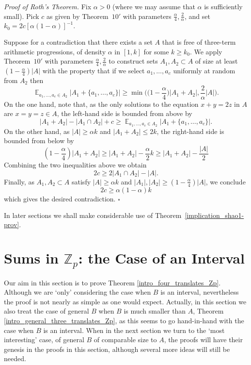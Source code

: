 \documentclass[12pt,reqno]{amsart}
\DeclareMathOperator*{\E}{\mathbb{E}}
\theoremstyle{definition}
\renewcommand\leq{\leqslant}
\renewcommand\geq{\geqslant}
\begin{document}
\vspace{5pt}
\noindent
{\em Proof of Roth's Theorem.}
Fix $\alpha>0$ (where we may assume that $\alpha$ is sufficiently small). Pick $c$ as given by
Theorem~$10'$ with parameters $\frac{\alpha}{4}, \frac{2}{\alpha}$, and set
$k_0=2c[\alpha(1-\alpha)]^{-1}$.

\vspace{5pt}
Suppose for a contradiction that there exists a set $A$ that is free of three-term arithmetic
progressions, of density $\alpha$ in $[1,k]$ for some $k \geq k_0$. We apply Theorem~$10'$
with parameters $\frac{\alpha}{4}, \frac{2}{\alpha}$ to construct sets $A_1, A_2 \subset A$ of size at least $(1-\frac{\alpha}{4})|A|$ with the property that if we select $a_1, \hdots, a_c$ uniformly at random
from $A_2$ then $$\E_{a_1, \hdots, a_c \in A_2}\bigg|A_1+\{a_1, \hdots, a_c\}\bigg| \geq \min\bigg(\big(1-\frac{\alpha}{4}\big)|A_1+A_2|,\frac{2}{\alpha} |A| \bigg).$$
On the one hand, note that, as the only solutions to the equation $x+y=2z$ in $A$ are $x=y=z \in A$, the left-hand side is bounded from above by $$|A_1+A_2|-|A_1\cap A_2|+c\geq \E_{a_1, \hdots, a_c \in A_2}\bigg|A_1+\{a_1, \hdots, a_c\}\bigg|.$$
On the other hand, as $|A| \geq \alpha k$ and $|A_1+A_2| \leq 2k$, the right-hand side is bounded from below by
$$(1-\frac{\alpha}{4})|A_1+A_2| \geq |A_1+A_2| - \frac{\alpha}{2}k \geq |A_1+A_2|-\frac{|A|}{2}$$
Combining the two inequalities above we obtain $$ 2c \geq 2|A_1\cap A_2| -|A|.$$
Finally, as $A_1, A_2 \subset A$ satisfy $|A|\geq \alpha k$ and $|A_1|,|A_2| \geq (1-\frac{\alpha}{4})|A|$, we conclude
$$2c \geq \alpha (1-\alpha)k $$
which gives the desired contradiction. \hfill{$\square$}

\vspace{10pt}
In later sections we shall make considerable use of Theorem~\ref{implication_shao1-prov}.

\section{Sums in ${\mathbb Z}_p$: the Case of an Interval}

Our aim in this section is to prove Theorem \ref{intro_four_translates_Zp}. Although we are `only' considering
the case when $B$ is an interval, nevertheless the proof is not nearly as simple as one would expect.
Actually, in this section we also treat the case of general $B$ when $B$ is much smaller than $A$,
Theorem \ref{intro_general_three_translates_Zp}, as this seems to go hand-in-hand with the case when $B$ is an
interval. When in the next section we turn to the `most interesting' case, of general $B$ of comparable size to $A$, the
proofs will have their genesis in the proofs in this section,  although several more ideas will still be needed.
\end{document}
